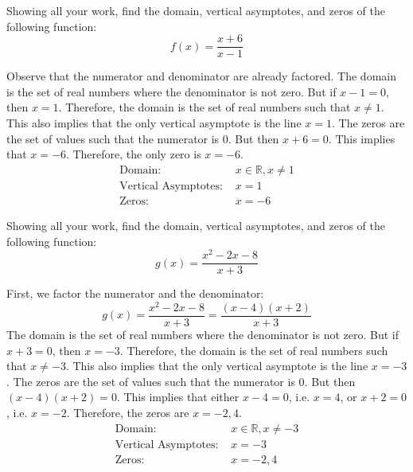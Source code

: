 \documentclass[11pt,letterpaper]{article}
\begin{document}

 Showing all your work, find the domain, vertical asymptotes, and zeros of the following function:
	\[
	f(x)= \dfrac{x + 6}{x - 1}
	\] \pspace

\sol Observe that the numerator and denominator are already factored. The domain is the set of real numbers where the denominator is not zero. But if $x - 1= 0$, then $x= 1$. Therefore, the domain is the set of real numbers such that $x \neq 1$. This also implies that the only vertical asymptote is the line $x= 1$. The zeros are the set of values such that the numerator is 0. But then $x + 6= 0$. This implies that $x= -6$. Therefore, the only zero is $x= -6$. 
	\[
	\boxed{
	\begin{aligned}
	\text{Domain: }& x \in \mathbb{R}, x \neq 1 \\
	\text{Vertical Asymptotes: }& x= 1 \\
	\text{Zeros: }& x= -6
	\end{aligned}
	}
	\]





\newpage





 Showing all your work, find the domain, vertical asymptotes, and zeros of the following function:
	\[
	g(x)= \dfrac{x^2 - 2x - 8}{x + 3}
	\] \pspace

\sol First, we factor the numerator and the denominator:
	\[
	g(x)= \dfrac{x^2 - 2x - 8}{x + 3}= \dfrac{(x - 4)(x + 2)}{x + 3}
	\]
The domain is the set of real numbers where the denominator is not zero. But if $x + 3= 0$, then $x= -3$. Therefore, the domain is the set of real numbers such that $x \neq -3$. This also implies that the only vertical asymptote is the line $x= -3$. The zeros are the set of values such that the numerator is 0. But then $(x - 4)(x + 2)= 0$. This implies that either $x - 4= 0$, i.e. $x= 4$, or $x + 2= 0$, i.e. $x= -2$. Therefore, the zeros are $x= -2, 4$. 
	\[
	\boxed{
	\begin{aligned}
	\text{Domain: }& x \in \mathbb{R}, x \neq -3 \\
	\text{Vertical Asymptotes: }& x= -3 \\
	\text{Zeros: }& x= -2, 4
	\end{aligned}
	}
	\]
\end{document}
